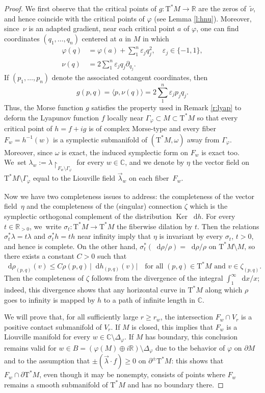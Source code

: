 \documentclass[10pt]{amsart}
\let\epsilon\varepsilon
\newcommand{\C}{{\mathbb C}}
\newcommand{\R}{{\mathbb R}}
\newcommand{\Crit}{\Gamma_{\!\varphi}}
\newcommand{\Discr}{\Delta_\varphi}
\newcommand{\Ker}{\operatorname{Ker}}
\newcommand{\etc}{,\ldots,}
\newcommand{\sT}{\mathrm{T}^\ast}
\renewcommand{\d}{\mathop{}\!\mathrm d}
\newcommand{\drho}{\d\rho}
\renewcommand{\dh}{\d h}
\newcommand{\dx}{\d x}
\newcommand{\hnu}{\tilde\nu}
\newcommand{\prg}[1]{\langle #1 \rangle}
\newcommand{\de}{\mathrel{:=}}
\newcommand{\rst}[1]{{\upharpoonright}_{\!#1}}
\let\del\partial
\let\on\colon
\let\sgn\epsilon
\theoremstyle{plain}
\theoremstyle{definition}
\begin{document}
\begin{proof}
We first observe that the critical points of $g \on \sT M \to \R$ are the zeros
of~$\hnu$, and hence coincide with the critical points of $\varphi$ (see Lemma
\ref{l:hnu}). Moreover, since~$\nu$ is an adapted gradient, near each critical
point $a$ of $\varphi$, one can find coordinates $(q_1 \etc q_n)$ centered at
$a$ in $M$ in which
\begin{align*}
	\varphi(q) &= \varphi(a) + \sum_1^n \sgn_j q_j^2, \quad \sgn_j \in \{-1,1\},
	\\ \tag*{and}
	\nu(q) &= 2 \sum_1^n \sgn_j q_j \del_{q_j}.
\end{align*}
If $(p_1 \etc p_n)$ denote the associated cotangent coordinates, then
\[
g(p,q) = \prg{p, \nu(q)} = 2 \sum_1^n \sgn_j p_jq_j.
\]
Thus, the Morse function $g$ satisfies the property used in Remark \ref{r:lyap}
to deform the Lyapunov function $f$ locally near $\Crit \subset M \subset \sT M$
so that every critical point of $h = f+ig$ is of complex Morse-type and every
fiber $F_w = h^{-1}(w)$ is a symplectic submanifold of $(\sT M, \omega)$ away
from $\Crit$. Moreover, since $\omega$ is exact, the induced symplectic form on
$F_w$ is exact too. We~set $\lambda_w \de \lambda \rst{ F_w\setminus \Crit }$ for every
$w \in \C$, and we denote by $\eta$ the vector field on $\sT M\setminus \Crit$ equal to
the Liouville field $\vec\lambda_w$ on each fiber~$F_w$.

Now we have two completeness issues to address: the completeness of the vector
field~$\eta$ and the completeness of the (singular) connection $\zeta$ which is
the symplectic orthogonal complement of the distribution $\Ker \dh$. For every
$t \in \R_{>0}$, we~write $\sigma_t \on \sT M \to \sT M$ the fiberwise dilation
by $t$. Then the relations $\sigma_t^*\lambda = t\lambda$ and $\sigma_t^*h = th$
near infinity imply that $\eta$ is invariant by every $\sigma_t$, $t>0$, and
hence is complete. On the other hand, $\sigma_t^*(\drho/\rho) = \drho/\rho$ on
$\sT M \setminus M$, so there exists a constant $C>0$ such that
\[
\drho_{(p,q)} (v) \le C \rho(p,q) \, \bigl|\dh_{(p,q)}(v)\bigr| \quad
	\text{for all $(p,q) \in \sT M$ and $v \in \zeta_{(p,q)}$.}
\]
Then the completeness of $\zeta$ follows from the divergence of the integral
$\int_1^\infty \dx / x$; indeed, this divergence shows that any horizontal curve
in $\sT M$ along which $\rho$ goes to infinity is mapped by $h$ to a path of
infinite length in $\C$.

We will prove that, for all sufficiently large $r \ge r_w$, the intersection
$F_w \cap V_r$ is a positive contact submanifold of $V_r$. If $M$ is closed,
this implies that $F_w$ is a Liouville manifold for every $w \in \C \setminus \Discr$.
If $M$ has boundary, this conclusion remains valid for $w \in B = (\varphi(M)
\oplus i\R) \setminus \Discr$ due to the behavior of $\varphi$ on $\del M$ and to the
assumption that $\pm (\vec\lambda \cdot f) \ge 0$ on $\del^\pm \sT M$: this
shows that $F_w \cap \del\sT M$, even though it may be nonempty, consists of
points where $F_w$ remains a smooth submanifold of $\sT M$ and has no boundary
there.


\end{proof}
\end{document}
